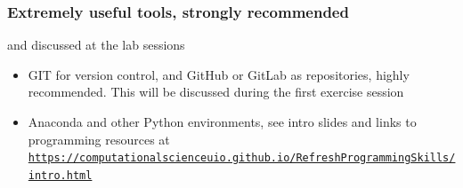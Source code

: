\documentclass{beamer}
\begin{document}
\begin{frame}
\frametitle{Extremely useful tools, strongly recommended}

\begin{block}{and discussed at the lab sessions }
\begin{itemize}
  \item GIT for version control, and GitHub or GitLab as repositories, highly recommended. This will be discussed during the first exercise session

  \item Anaconda and other Python environments, see intro slides and links to programming resources at \href{{https://computationalscienceuio.github.io/RefreshProgrammingSkills/intro.html}}{\nolinkurl{https://computationalscienceuio.github.io/RefreshProgrammingSkills/intro.html}}
\end{itemize}

\noindent
\end{block}
\end{frame}
\end{document}

